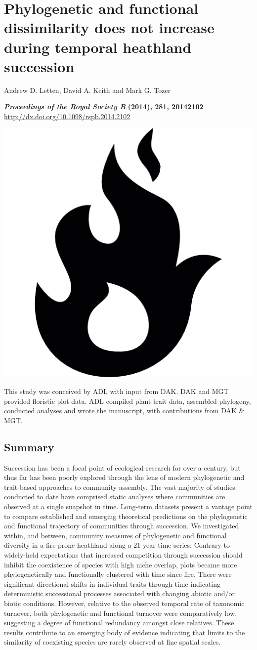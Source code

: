 

\chapter{Phylogenetic and functional dissimilarity does not increase during temporal heathland succession} 

\graphicspath{{Chapter4/Figs}}

\begin{center}

{\large Andrew D. Letten, David A. Keith and Mark G. Tozer}

\small{\textit{\textbf{Proceedings of the Royal Society B}} \textbf{(2014), 281, 20142102}}
\url{http://dx.doi.org/10.1098/rspb.2014.2102}

\vspace{1in}
\includegraphics[width=0.15\linewidth]{Chapter4/Figs/flame2}

\vfill
This study was conceived by ADL with input from DAK. DAK and MGT provided floristic plot data. ADL compiled plant trait data, assembled phylogeny, conducted analyses and wrote the manuscript, with contributions from DAK \& MGT. 

\end{center}

\newpage
\section{Summary}

Succession has been a focal point of ecological research for over a century, but thus far has been poorly explored through the lens of modern phylogenetic and trait-based approaches to community assembly. The vast majority of studies conducted to date have comprised static analyses where communities are observed at a single snapshot in time. Long-term datasets present a vantage point to compare established and emerging theoretical predictions on the phylogenetic and functional trajectory of communities through succession. We investigated within, and between, community measures of phylogenetic and functional diversity in a fire-prone heathland along a 21-year time-series. Contrary to widely-held expectations that increased competition through succession should inhibit the coexistence of species with high niche overlap, plots became more phylogenetically and functionally clustered with time since fire. There were significant directional shifts in individual traits through time indicating deterministic successional processes associated with changing abiotic and/or biotic conditions. However, relative to the observed temporal rate of taxonomic turnover, both phylogenetic and functional turnover were comparatively low, suggesting a degree of functional redundancy amongst close relatives. These results contribute to an emerging body of evidence indicating that limits to the similarity of coexisting species are rarely observed at fine spatial scales.

